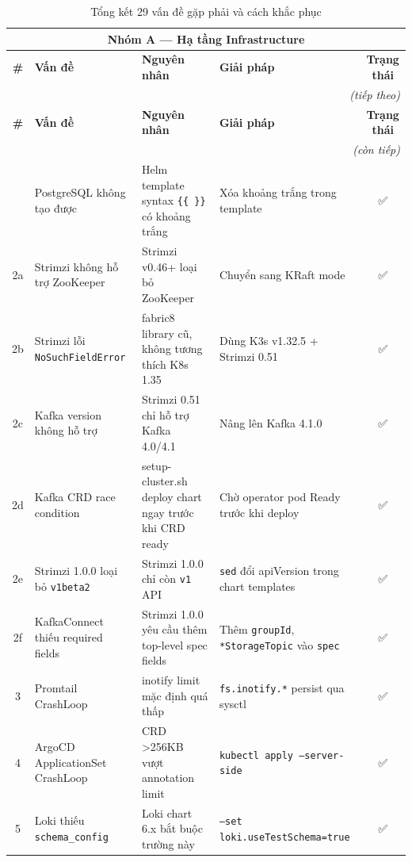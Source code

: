 \begin{center}
\renewcommand{\arraystretch}{1.3}
\begin{longtable}{|c|p{3cm}|p{3.8cm}|p{3.8cm}|c|}
\caption{Tổng kết 29 vấn đề gặp phải và cách khắc phục}
\label{tab:issues-summary} \\
\hline
\multicolumn{5}{|c|}{\textbf{Nhóm A — Hạ tầng Infrastructure}} \\
\hline
\textbf{\#} & \textbf{Vấn đề} & \textbf{Nguyên nhân} & \textbf{Giải pháp} & \textbf{Trạng thái} \\
\hline
\endfirsthead
\hline
\multicolumn{5}{|r|}{\small\itshape (tiếp theo)} \\
\hline
\textbf{\#} & \textbf{Vấn đề} & \textbf{Nguyên nhân} & \textbf{Giải pháp} & \textbf{Trạng thái} \\
\hline
\endhead
\hline
\multicolumn{5}{|r|}{\small\itshape (còn tiếp)} \\
\endfoot
\hline
\endlastfoot
1 & PostgreSQL không tạo được & Helm template syntax \texttt{\{\{ \}\}} có khoảng trắng & Xóa khoảng trắng trong template & ✅ \\
\hline
2a & Strimzi không hỗ trợ ZooKeeper & Strimzi v0.46+ loại bỏ ZooKeeper & Chuyển sang KRaft mode & ✅ \\
\hline
2b & Strimzi lỗi \texttt{NoSuchFieldError} & fabric8 library cũ, không tương thích K8s 1.35 & Dùng K3s v1.32.5 + Strimzi 0.51 & ✅ \\
\hline
2c & Kafka version không hỗ trợ & Strimzi 0.51 chỉ hỗ trợ Kafka 4.0/4.1 & Nâng lên Kafka 4.1.0 & ✅ \\
\hline
2d & Kafka CRD race condition & setup-cluster.sh deploy chart ngay trước khi CRD ready & Chờ operator pod Ready trước khi deploy & ✅ \\
\hline
2e & Strimzi 1.0.0 loại bỏ \texttt{v1beta2} & Strimzi 1.0.0 chỉ còn \texttt{v1} API & \texttt{sed} đổi apiVersion trong chart templates & ✅ \\
\hline
2f & KafkaConnect thiếu required fields & Strimzi 1.0.0 yêu cầu thêm top-level spec fields & Thêm \texttt{groupId}, \texttt{*StorageTopic} vào \texttt{spec} & ✅ \\
\hline
3 & Promtail CrashLoop & inotify limit mặc định quá thấp & \texttt{fs.inotify.*} persist qua sysctl & ✅ \\
\hline
4 & ArgoCD ApplicationSet CrashLoop & CRD \textgreater{}256KB vượt annotation limit & \texttt{kubectl apply --server-side} & ✅ \\
\hline
5 & Loki thiếu \texttt{schema\_config} & Loki chart 6.x bắt buộc trường này & \texttt{--set loki.useTestSchema=true} & ✅ \\

\end{longtable}
\end{center}
